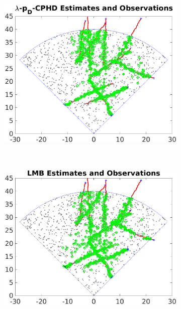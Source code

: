 \documentclass{article}
\begin{document}
\begin{figure}[h]
\begin{subfigure}[t]{0.32\textwidth}
    \includegraphics[width=1\linewidth]{lpdcphd_tracks.png}
  \end{subfigure}%
\\ \medskip
    \begin{subfigure}[t]{0.32\textwidth}
    \centering
    \includegraphics[width=1\linewidth]{lmb_tracks.png}
  \end{subfigure}%
  ~ 
  \begin{subfigure}[t]{0.32\textwidth}
    \centering

\end{subfigure}
\end{figure}
\end{document}
